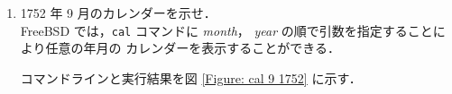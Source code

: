 \documentclass[a4j]{jreport}
\begin{document}
\begin{enumerate}[labelindent=\parindent, leftmargin=*, label=課題 \arabic*）]
%
%
%
%
  \item 1752 年 9 月のカレンダーを示せ．\\

	FreeBSD では，\texttt{cal} コマンドに \textit{month}，
	\textit{year} の順で引数を指定することにより任意の年月の
	カレンダーを表示することができる．

	コマンドラインと実行結果を図 \ref{Figure: cal 9 1752} に示す．


\end{enumerate}
\end{document}
